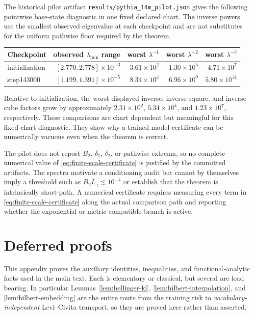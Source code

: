 \documentclass[11pt]{article}
\theoremstyle{definition}
\theoremstyle{remark}
\begin{document}
The historical pilot artifact \texttt{results/pythia\_14m\_pilot.json} gives the following pointwise base-state diagnostic in one fixed declared chart. The inverse powers use the smallest observed eigenvalue at each checkpoint and are not substitutes for the uniform pathwise floor required by the theorem.
\begin{center}
\small
\begin{tabular}{lrrrr}
\toprule
Checkpoint & observed $\lambda_{\min}$ range & worst $\lambda^{-1}$ & worst $\lambda^{-2}$ & worst $\lambda^{-3}$\\
\midrule
initialization & $[2.770,2.778]\times10^{-3}$ & $3.61\times10^2$ & $1.30\times10^5$ & $4.71\times10^7$\\
step143000 & $[1.199,1.391]\times10^{-5}$ & $8.34\times10^4$ & $6.96\times10^9$ & $5.80\times10^{14}$\\
\bottomrule
\end{tabular}
\end{center}
Relative to initialization, the worst displayed inverse, inverse-square, and inverse-cube factors grow by approximately $2.31\times10^2$, $5.34\times10^4$, and $1.23\times10^7$, respectively. These comparisons are chart dependent but meaningful for this fixed-chart diagnostic. They show why a trained-model certificate can be numerically vacuous even when the theorem is correct.

The pilot does not report $B_2$, $\delta_1$, $\delta_2$, or pathwise extrema, so no complete numerical value of \eqref{eq:finite-scale-certificate} is justified by the committed artifacts. The spectra motivate a conditioning audit but cannot by themselves imply a threshold such as $B_2L_\gamma\lesssim10^{-4}$ or establish that the theorem is intrinsically short-path. A numerical certificate requires measuring every term in \eqref{eq:finite-scale-certificate} along the actual comparison path and reporting whether the exponential or metric-compatible branch is active.

\section{Deferred proofs}\label{app:deferred}

This appendix proves the auxiliary identities, inequalities, and
functional-analytic facts used in the main text. Each is elementary or
classical, but several are load bearing. In particular
Lemmas~\ref{lem:hellinger-kl}, \ref{lem:hilbert-interpolation}, and
\ref{lem:hilbert-embedding} are the entire route from the training risk to
\emph{vocabulary-independent} Levi--Civita transport, so they are proved here
rather than asserted.
\end{document}
